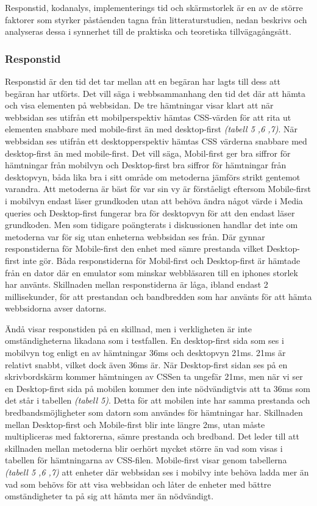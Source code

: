 \documentclass[11pt]{article}
\begin{document}
Responstid, kodanalys, implementerings tid och skärmstorlek är en av de större faktorer som styrker påståenden tagna från litteraturstudien, nedan beskrivs och analyseras dessa i synnerhet till de praktiska och teoretiska tillvägagångsätt.

\subsubsection{Responstid}
Responstid är den tid det tar mellan att en begäran har lagts till dess att begäran har utförts. Det vill säga i webbsammanhang den tid det där att hämta och visa elementen på webbsidan. De tre hämtningar visar klart att när webbsidan ses utifrån ett mobilperspektiv hämtas CSS-värden för att rita ut elementen snabbare med mobile-first än med desktop-first \textit{(tabell 5 ,6 ,7)}. När webbsidan ses utifrån ett desktopperspektiv hämtas CSS värderna snabbare med desktop-first än med mobile-first. Det vill säga, Mobil-first ger bra siffror för hämtningar från mobilvyn och Desktop-first bra siffror för hämtningar från desktopvyn, båda lika bra i sitt område om metoderna jämförs strikt gentemot varandra. Att metoderna är bäst för var sin vy är förståeligt eftersom Mobile-first i mobilvyn endast läser grundkoden utan att behöva ändra något värde i Media queries och Desktop-first fungerar bra för desktopvyn för att den endast läser grundkoden. Men som tidigare poängterats i diskussionen handlar det inte om metoderna var för sig utan enheterna webbsidan ses från. Där gynnar responstiderna för Mobile-first den enhet med sämre prestanda vilket Desktop-first inte gör. Båda responstiderna för Mobil-first och Desktop-first är hämtade från en dator där en emulator som minskar webbläsaren till en iphones storlek har använts. Skillnaden mellan responstiderna är låga, ibland endast 2 millisekunder, för att prestandan och bandbredden som har använts för att hämta webbsidorna avser datorns. 

Ändå visar responstiden på en skillnad, men i verkligheten är inte omständigheterna likadana som i testfallen. En desktop-first sida som ses i mobilvyn tog enligt en av hämtningar 36ms och desktopvyn 21ms. 21ms är relativt snabbt, vilket dock även 36ms är. När Desktop-first sidan ses på en skrivbordskärm kommer hämtningen av CSSen ta ungefär 21ms, men när vi ser en Desktop-first sida på mobilen kommer den inte nödvändigtvis att ta 36ms som det står i tabellen \textit{(tabell 5)}. Detta för att mobilen inte har samma prestanda och bredbandsmöjligheter som datorn som användes för hämtningar har. Skillnaden mellan Desktop-first och Mobile-first blir inte längre 2ms, utan måste multipliceras med faktorerna, sämre prestanda och bredband. Det leder till att skillnaden mellan metoderna blir oerhört mycket större än vad som visas i tabellen för hämtningarna av CSS-filen. Mobile-first visar genom tabellerna \textit{(tabell 5 ,6 ,7)} att enheter där webbsidan ses i mobilvy inte behöva ladda mer än vad som behövs för att visa webbsidan och låter de enheter med bättre omständigheter ta på sig att hämta mer än nödvändigt.
\end{document}
